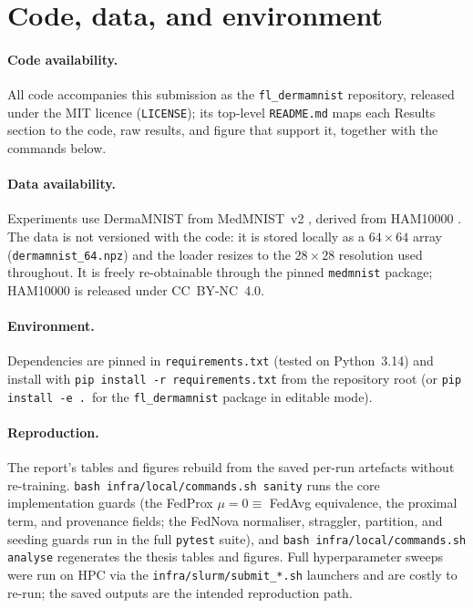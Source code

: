 \documentclass[11pt,a4paper]{report}
\begin{document}
\section{Code, data, and environment}
\label{app:repro-setup}

\paragraph{Code availability.}
All code accompanies this submission as the \texttt{fl\_dermamnist} repository,
released under the MIT licence (\texttt{LICENSE}); its top-level
\texttt{README.md} maps each Results section to the code, raw results, and figure
that support it, together with the commands below.

\paragraph{Data availability.}
Experiments use DermaMNIST from MedMNIST~v2 \citep{yang2023medmnistv2}, derived
from HAM10000 \citep{tschandl2018ham10000}. The data is not versioned with the
code: it is stored locally as a $64\times64$ array (\texttt{dermamnist\_64.npz})
and the loader resizes to the $28\times28$ resolution used throughout. It is
freely re-obtainable through the pinned \texttt{medmnist} package; HAM10000 is
released under CC~BY-NC~4.0.

\paragraph{Environment.}
Dependencies are pinned in \texttt{requirements.txt} (tested on Python~3.14) and
install with \texttt{pip install -r requirements.txt} from the repository root
(or \texttt{pip install -e .}\ for the \texttt{fl\_dermamnist} package in editable
mode).

\paragraph{Reproduction.}
The report's tables and figures rebuild from the saved per-run artefacts without
re-training. \texttt{bash infra/local/commands.sh sanity} runs the core
implementation guards (the FedProx $\mu=0\equiv$ FedAvg equivalence, the proximal
term, and provenance fields; the FedNova normaliser, straggler, partition, and
seeding guards run in the full \texttt{pytest} suite), and
\texttt{bash infra/local/commands.sh analyse} regenerates the thesis tables and
figures. Full hyperparameter sweeps were run on HPC via the
\texttt{infra/slurm/submit\_*.sh} launchers and are costly to re-run; the saved
outputs are the intended reproduction path.
\end{document}
